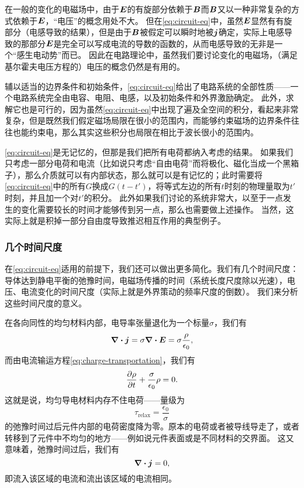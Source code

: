 \documentclass[UTF8, a4paper]{ctexart}
\begin{document}
在一般的变化的电磁场中，由于$\vb*{E}$的有旋部分依赖于$\vb*{B}$而$\vb*{B}$又以一种非常复杂的方式依赖于$\vb*{E}$，“电压”的概念用处不大。
但在\eqref{eq:circuit-eq}中，虽然$\vb*{E}$显然有有旋部分（电感导致的结果），但是由于$\vb*{B}$被假定可以瞬时地被$\vb*{j}$确定，实际上电感导致的那部分$\vb*{E}$是完全可以写成电流的导数的函数的，从而电感导致的无非是一个“感生电动势”而已。
因此在电路理论中，虽然我们要讨论变化的电磁场，（满足基尔霍夫电压方程的）电压的概念仍然是有用的。

辅以适当的边界条件和初始条件，\eqref{eq:circuit-eq}给出了电路系统的全部性质——一个电路系统完全由电容、电阻、电感，以及初始条件和外界激励确定。
此外，求解它也是可行的，因为虽然\eqref{eq:circuit-eq}中出现了遍及全空间的积分，看起来非常复杂，但是既然我们假定磁场局限在很小的范围内，而能够约束磁场的边界条件往往也能约束电，那么其实这些积分也局限在相比于波长很小的范围内。

\eqref{eq:circuit-eq}是无记忆的，但那是我们把所有电荷都纳入考虑的结果。
如果我们只考虑一部分电荷和电流（比如说只考虑“自由电荷”而将极化、磁化当成一个黑箱子），那么介质就可以有内部状态，那么就可以是有记忆的；此时需要将\eqref{eq:circuit-eq}中的所有$G$换成$G(t-t')$，将等式左边的所有$t$时刻的物理量取为$t'$时刻，并且加一个对$t'$的积分。
此外如果我们讨论的系统非常大，以至于一点发生的变化需要较长的时间才能够传到另一点，那么也需要做上述操作。
当然，这实际上就是积掉一部分自由度导致推迟相互作用的典型例子。

\subsubsection{几个时间尺度}

在\eqref{eq:circuit-eq}适用的前提下，我们还可以做出更多简化。我们有几个时间尺度：导体达到静电平衡的弛豫时间，电磁场传播的时间（系统长度尺度除以光速），电压、电流变化的时间尺度（实际上就是外界策动的频率尺度的倒数）。
我们来分析这些时间尺度的意义。

在各向同性的均匀材料内部，电导率张量退化为一个标量$\sigma$，我们有
\[
    \div{\vb*{j}} = \sigma \div{\vb*{E}} = \sigma \frac{\rho}{\epsilon_0},
\]
而由电流输运方程\eqref{eq:charge-transportation}，我们有
\[
    \pdv{\rho}{t} + \frac{\sigma}{\epsilon_0} \rho = 0.
\]
这就是说，均匀导电材料内存不住电荷——量级为
\begin{equation}
    \tau_\text{relax} = \frac{\epsilon_0}{\sigma}
    \label{eq:static-relaxation-time}
\end{equation}
的弛豫时间过后元件内部的电荷密度降为零。原本的电荷或者被导线导走了，或者转移到了元件中不均匀的地方——例如说元件表面或是不同材料的交界面。
这又意味着，弛豫时间过后，我们有
\[
    \div{\vb*{j}} = 0,
\]
即流入该区域的电流和流出该区域的电流相同。
\end{document}
